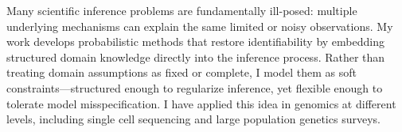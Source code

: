 



Many scientific inference problems are fundamentally ill-posed: multiple underlying mechanisms can explain the same limited or noisy observations. My work develops probabilistic methods that restore identifiability by embedding structured domain knowledge directly into the inference process. Rather than treating domain assumptions as fixed or complete, I model them as soft constraints---structured enough to regularize inference, yet flexible enough to tolerate model misspecification. I have applied this idea in genomics at different levels, including single cell sequencing and large population genetics surveys.
